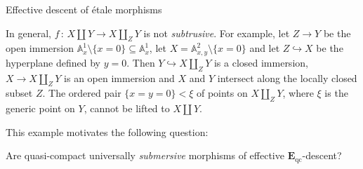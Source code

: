 \documentclass[a4paper,twoside,11pt]{amsart}[2009/07/02] %
\newcommand{\inj}{\hookrightarrow}
\newcommand{\map}[3]{#1\,:\, #2\rightarrow #3}
\newcommand{\etale}{\'{e}tale}
\newcommand{\A}[1]{\mathbb{A}^{#1}}    %
\newcommand{\catE}{\mathbf{E}}
\newcommand{\qc}{\mathrm{qc}}
\begin{document}
\begin{section}{Effective descent of \etale{} morphisms}
\begin{example}
In general, $\map{f}{X\amalg Y}{X\amalg_Z Y}$ is not
\emph{subtrusive}. For example, let $Z\to Y$ be the open immersion
$\A{1}_x\setminus \{x=0\}\subseteq \A{1}_x$, let $X=\A{2}_{x,y}\setminus
\{x=0\}$ and let $Z\inj X$ be the hyperplane defined by $y=0$. Then
$Y\inj X\amalg_Z Y$ is a closed immersion, $X\to X\amalg_Z Y$ is an
open immersion and $X$ and $Y$ intersect along the locally closed subset
$Z$. The ordered pair $\{x=y=0\} < \xi$ of points on $X\amalg_Z Y$, where
$\xi$ is the generic point on $Y$, cannot be lifted to $X\amalg Y$.
\end{example}

This example motivates the following question:

\begin{question}
Are quasi-compact universally \emph{submersive} morphisms of effective
$\catE_{\qc}$-descent?
\end{question}

\end{section}

\end{document}

